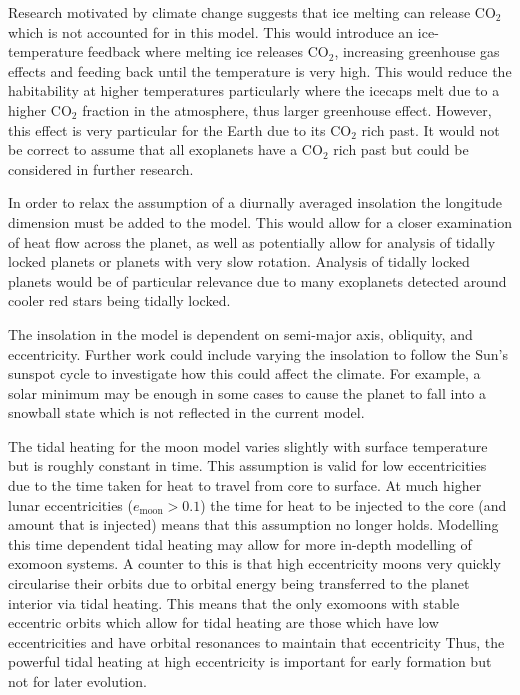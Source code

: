 \documentclass[12pt, onecolumn]{revtex4-2}    %
\begin{document}
Research motivated by climate change suggests that ice melting can release CO$_2$ which is not accounted for in this model.
This would introduce an ice-temperature feedback where melting ice releases CO$_2$, increasing greenhouse gas effects and feeding back until the temperature is very high.
This would reduce the habitability at higher temperatures particularly where the icecaps melt due to a higher CO$_2$ fraction in the atmosphere, thus larger greenhouse effect.
However, this effect is very particular for the Earth due to its CO$_2$ rich past.
It would not be correct to assume that all exoplanets have a CO$_2$ rich past but could be considered in further research.

In order to relax the assumption of a diurnally averaged insolation the longitude dimension must be added to the model.
This would allow for a closer examination of heat flow across the planet, as well as potentially allow for analysis of tidally locked planets or planets with very slow rotation.
Analysis of tidally locked planets would be of particular relevance due to many exoplanets detected around cooler red stars being tidally locked.

The insolation in the model is dependent on semi-major axis, obliquity, and eccentricity. 
Further work could include varying the insolation to follow the Sun's sunspot cycle to investigate how this could affect the climate.
For example, a solar minimum may be enough in some cases to cause the planet to fall into a snowball state which is not reflected in the current model.

The tidal heating for the moon model varies slightly with surface temperature but is roughly constant in time.
This assumption is valid for low eccentricities due to the time taken for heat to travel from core to surface.
At much higher lunar eccentricities ($e_\text{moon} > 0.1$) the time for heat to be injected to the core (and amount that is injected) means that this assumption no longer holds.
Modelling this time dependent tidal heating may allow for more in-depth modelling of exomoon systems.
A counter to this is that high eccentricity moons very quickly circularise their orbits due to orbital energy being transferred to the planet interior via tidal heating.
This means that the only exomoons with stable eccentric orbits which allow for tidal heating are those which have low eccentricities and have orbital resonances to maintain that eccentricity
Thus, the powerful tidal heating at high eccentricity is important for early formation but not for later evolution.
\end{document}
